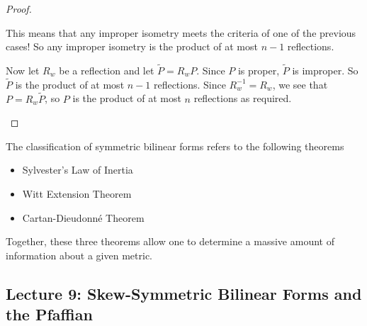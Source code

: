 \begin{proof}
\begin{enumerate}
{\begin{enumerate}[i)]
{This means that any improper isometry meets the criteria of one of the previous cases! So any improper isometry is the product of at most $n-1$ reflections. 

Now let $R_w$ be a reflection and let $\tilde{P}=R_w P$. Since $P$ is proper, $\tilde{P}$ is improper. So $\tilde{P}$ is the product of at most $n-1$ reflections. Since $R_w^{-1} = R_w$, we  see that $P = R_w \tilde{P}$, so $P$ is the product of at most $n$ reflections as required.
}
    \end{enumerate}
    }
    \end{enumerate}
    \end{proof}
\begin{thm}
The classification of symmetric bilinear forms refers to the following theorems
\begin{itemize}
\item {Sylvester's Law of Inertia}
\item {Witt Extension Theorem}
\item {Cartan-Dieudonn\'e Theorem}
\end{itemize}
Together, these three theorems allow one to determine a massive amount of information about a given metric.
\end{thm}

\subsection{Lecture 9: Skew-Symmetric Bilinear Forms and the Pfaffian}
